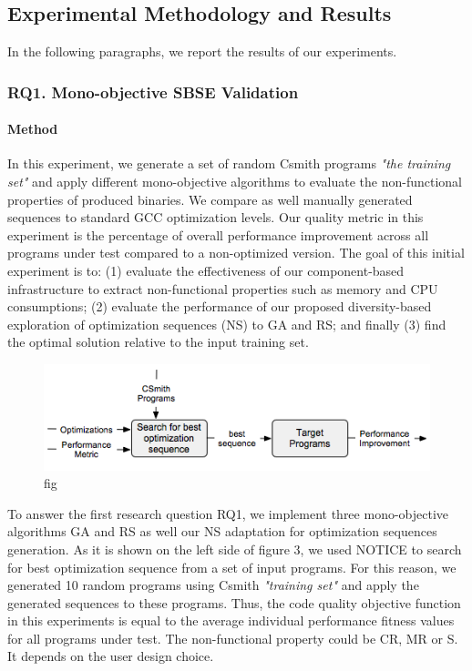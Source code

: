 \subsection{Experimental Methodology and Results}
In the following paragraphs, we report the results of our experiments.

\subsubsection{RQ1. Mono-objective SBSE Validation}
\paragraph{Method}
In this experiment, we generate a set of random Csmith programs \textit{"the training set"} and apply different mono-objective algorithms to evaluate the non-functional properties of produced binaries. We compare as well manually generated sequences to standard GCC optimization levels. Our quality metric in this experiment is the percentage of overall performance improvement across all programs under test compared to a non-optimized version. The goal of this initial experiment is to: (1) evaluate the effectiveness of our component-based infrastructure to extract non-functional properties such as memory and CPU consumptions; (2) evaluate the performance of our proposed diversity-based exploration of optimization sequences (NS) to GA and RS; and finally (3) find the optimal solution relative to the input training set.



\begin{figure}[h]
	\centering
	\includegraphics[width=1.\linewidth]{Ressources/sensitivity.png}
	\caption{fig}
\end{figure}

To answer the first research question RQ1, we implement three mono-objective algorithms GA and RS as well our NS adaptation for optimization sequences generation. As it is shown on the left side of figure 3, we used NOTICE to search for best optimization sequence from a set of input programs. For this reason, we generated 10 random programs using Csmith \textit{"training set"} and apply the generated sequences to these programs. Thus, the code quality objective function in this
experiments is equal to the average individual performance fitness values for all programs under test. The non-functional property could be CR, MR or S. It depends on the user design choice.
